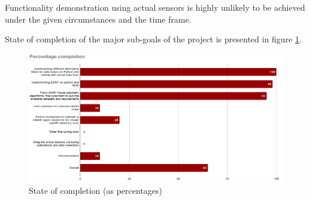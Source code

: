 Functionality demonstration using actual sensors is highly unlikely to be achieved under the given circumstances and the time frame.

State of completion of the major sub-goals of the project is presented in figure \ref{fig:pa:completionState}.
\begin{figure}[h]
	\centering
	\includegraphics[width=\textwidth]{figs/completion_state.png}
	\vspace{-0.5cm}
	\caption{State of completion (as percentages)}
	\label{fig:pa:completionState}
	\vspace{0.5cm}
\end{figure}